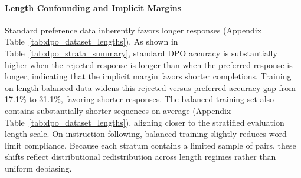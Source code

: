 \documentclass{article}
\begin{document}
\paragraph{Length Confounding and Implicit Margins}
Standard preference data inherently favors longer responses (Appendix Table~\ref{tab:dpo_dataset_lengths}). As shown in Table~\ref{tab:dpo_strata_summary}, standard DPO accuracy is substantially higher when the rejected response is longer than when the preferred response is longer, indicating that the implicit margin favors shorter completions. Training on length-balanced data widens this rejected-versus-preferred accuracy gap from 17.1\% to 31.1\%, favoring shorter responses. The balanced training set also contains substantially shorter sequences on average (Appendix Table~\ref{tab:dpo_dataset_lengths}), aligning closer to the stratified evaluation length scale. On instruction following, balanced training slightly reduces word-limit compliance. Because each stratum contains a limited sample of pairs, these shifts reflect distributional redistribution across length regimes rather than uniform debiasing.
\end{document}
